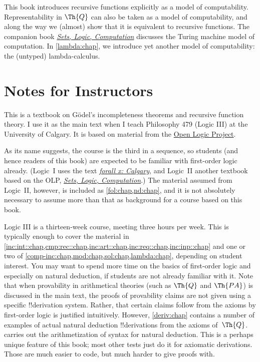 This book introduces recursive functions explicitly as a model of
computability. Representability in $\Th{Q}$ can also be taken as a
model of computability, and along the way we (almost) show that it is
equivalent to recursive functions. The companion book
\href{https://slc.openlogicproject.org/}{\emph{Sets, Logic, Computation}}
discusses the Turing machine model of computation. In
\cref{lambda:chap}, we introduce yet another model of computability:
the (untyped) lambda-calculus.

\section*{Notes for Instructors}

This is a textbook on G\"odel's incompleteness theorems and recursive
function theory. I use it as the main text when I teach Philosophy 479
(Logic III) at the University of Calgary. It is based on material from the
\href{https://openlogicproject.org}{Open Logic Project}.

As its name suggests, the course is the third in a sequence, so
students (and hence readers of this book) are expected to be familiar
with first-order logic already. (Logic~I uses the text
\href{https://forallx.openlogicproject.org}{\emph{forall x: Calgary}},
and Logic~II another textbook based on the OLP,
\href{https://slc.openlogicproject.org}{\emph{Sets, Logic,
Computation}}.) The material assumed from Logic~II, however, is
included as \cref{fol:chap,nd:chap}, and it is not absolutely
necessary to assume more than that as background for a course based on
this book.

Logic III is a thirteen-week course, meeting three hours per week.
This is typically enough to cover the material in
\cref{inc:int::chap,cmp:rec::chap,inc:art::chap,inc:req::chap,inc:inp::chap}
and one or two of \cref{comp-inc:chap,mod:chap,sol:chap,lambda:chap},
depending on student interest. You may want to spend more time on the
basics of first-order logic and especially on natural deduction, if
students are not already familiar with it. Note that when provability
in arithmetical theories (such as $\Th{Q}$ and $\Th{PA}$) is discussed
in the main text, the proofs of provability claims are not given using
a specific !!{derivation} system. Rather, that certain claims follow
from the axioms by first-order logic is justified intuitively.
However, \cref{deriv:chap} contains a number of examples of actual
natural deduction !!{derivation}s from the axioms of~$\Th{Q}$.
 carries out the arithmetization of syntax for
natural deduction. This is a perhaps unique feature of this book; most
other tests just do it for axiomatic derivations. Those are much
easier to code, but much harder to give proofs with.

